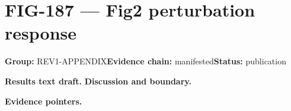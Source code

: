 \clearpage
\section{FIG-187 --- Fig2 perturbation response}
\label{figpage:fig-187}
\textbf{Group:} REV1-APPENDIX\quad \textbf{Evidence chain:} manifested\quad \textbf{Status:} publication

\textbf{Results text draft.} 
\textbf{Discussion and boundary.} 


\textbf{Evidence pointers.}



\vfill
